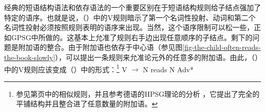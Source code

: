 经典的短语结构语法和依存语法的一个重要区别在于短语结构规则给子结点强加了特定的语序。也就是说，（）中的V规则暗示了第一个名词性投射、动词和第二个名词性投射必须按照规则表明的语序来出现。当然，这个语序限制可以松一些，正如GPSG中所做的。这基本上允准了规则右手边出现任意顺序的子结点。剩下的问题是附加语的整合。由于附加语也依存于中心语（参见图\vref{fig-the-child-often-reads-the-book-slowly}），可以提出一条规则来允准论元外的任意多的附加语。由此，（）中的V规则应该变成（）中的形式：\footnote{%
参见第\pageref{adv-metarule}页中\gpsgc 的相似规则，并且参考德语的HPSG理论的分析 \citep{Kasper94a}，它提出了完全的平铺结构并且整合进了任意数量的附加语。
}
\ea
V $\to$ N reads N Adv*
\z 

